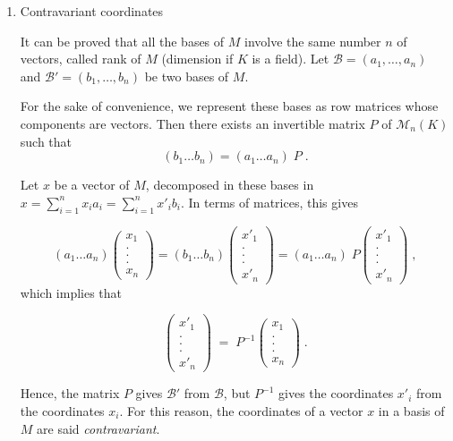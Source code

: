 \documentclass{report}
\theoremstyle{definition}
\theoremstyle{remark}
\begin{document}
 
    \medskip
\begin{enumerate}
    \item Contravariant coordinates
    
   
    It can be proved that all the bases of $M$ involve the same number $n$ of vectors, called rank of $M$ (dimension if $K$ is a field). Let $\mathcal{B}=(a_1,\dots,a_n)$ and $\mathcal{B}'=(b_1,\dots,b_n)$ be two bases of $M$.
    
    For the sake of convenience, we represent these bases as row matrices whose components are vectors. Then there exists an invertible matrix $P$ of $\mathcal{M}_n(K)$ such that 
    $$(b_1\dots b_n)=(a_1\dots a_n)\;P\;.$$
    
    Let $x$ be a vector of $M$, decomposed in these bases in $x=\sum_{i=1}^{n} x_ia_i=\sum_{i=1}^{n} x'_ib_i$. In terms of matrices, this gives 
    
    $$(a_1\dots a_n) \begin{pmatrix}x_1\\.\\.\\.\\x_n\end{pmatrix}=(b_1\dots b_n) \begin{pmatrix}x'_1\\.\\.\\.\\x'_n\end{pmatrix}=(a_1\dots a_n)\;P\begin{pmatrix}x'_1\\.\\.\\.\\x'_n\end{pmatrix}\;,$$
    which implies that 
    
    $$\begin{pmatrix}x'_1\\.\\.\\.\\x'_n\end{pmatrix}\;=\;P^{-1}\begin{pmatrix}x_1\\.\\.\\.\\x_n\end{pmatrix}\;.$$
    
    Hence, the matrix $P$ gives $\mathcal{B}'$ from $\mathcal{B}$, but $P^{-1}$ gives the coordinates $x'_i$ from the coordinates $x_i$. For this reason, the coordinates of a vector $x$ in a basis of $M$ are said \textit{contravariant}.


\end{enumerate}
\end{document}
